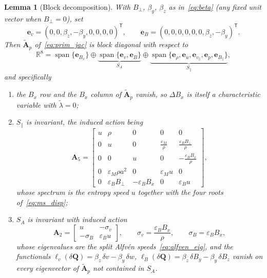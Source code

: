 \documentclass[a4paper,fleqn]{cas-sc}
\newtheorem{lemma}[theorem]{Lemma}
\theoremstyle{remark}
\newcommand{\eps}{\varepsilon}
\newcommand{\epsM}{\eps_{M}}
\newcommand{\epsB}{\eps_{B}}
\newcommand{\AAt}{\tilde{\mathbf{A}}}
\begin{document}
\begin{lemma}[Block decomposition]
\label{lem:blocks}
With $B_\perp$, $\beta_y$, $\beta_z$ as in~\eqref{eq:beta} (any fixed unit vector
when $B_\perp=0$), set
\[
\mathbf e_v=(0,0,\beta_z,-\beta_y,0,0,0,0)^{\mathsf T},\qquad
\mathbf e_B=(0,0,0,0,0,0,\beta_z,-\beta_y)^{\mathsf T}.
\]
Then $\AAt_{p}$ of~\eqref{eq:prim_jac} is block diagonal with respect to
\[
\mathbb R^{8}
=\operatorname{span}\{\mathbf e_{B_x}\}
\oplus\underbrace{\operatorname{span}\{\mathbf e_v,\mathbf e_B\}}_{S_A}
\oplus\underbrace{\operatorname{span}\{\mathbf e_\rho,\mathbf e_u,
 \mathbf e_{v_\parallel},\mathbf e_p,\mathbf e_{B_\parallel}\}}_{S_\parallel},
\]
and specifically
\begin{enumerate}
\item[\rm(i)] the $B_x$ row and the $B_x$ column of $\AAt_p$ vanish, so
$\Delta B_x$ is itself a characteristic variable with $\tilde\lambda=0$;
\item[\rm(ii)] $S_\parallel$ is invariant, the induced action being
\begin{equation}
\label{eq:A5}
\mathbf A_5=
\begin{bmatrix}
u & \rho & 0 & 0 & 0\\[2pt]
0 & u & 0 & \tfrac{\epsM}{\rho} & \tfrac{\epsB B_\perp}{\rho}\\[2pt]
0 & 0 & u & 0 & -\tfrac{\epsB B_x}{\rho}\\[2pt]
0 & \epsM\rho a^2 & 0 & \epsM u & 0\\[2pt]
0 & \epsB B_\perp & -\epsB B_x & 0 & \epsB u
\end{bmatrix},
\end{equation}
whose spectrum is the entropy speed $u$ together with the four roots
of~\eqref{eq:ms_disp};
\item[\rm(iii)] $S_A$ is invariant with induced action
\begin{equation}
\label{eq:A2}
\mathbf A_2=\begin{bmatrix} u & -\sigma_v\\ -\sigma_B & \epsB u\end{bmatrix},
\qquad \sigma_v=\frac{\epsB B_x}{\rho},\qquad \sigma_B=\epsB B_x,
\end{equation}
whose eigenvalues are the split Alfv\'en speeds~\eqref{eq:alfven_eig}, and the
functionals
$\ell_v(\delta\mathbf Q)=\beta_z\,\delta v-\beta_y\,\delta w$,
$\ell_B(\delta\mathbf Q)=\beta_z\,\delta B_y-\beta_y\,\delta B_z$
vanish on every eigenvector
of $\AAt_p$ not contained in $S_A$.
\end{enumerate}
\end{lemma}
\end{document}
